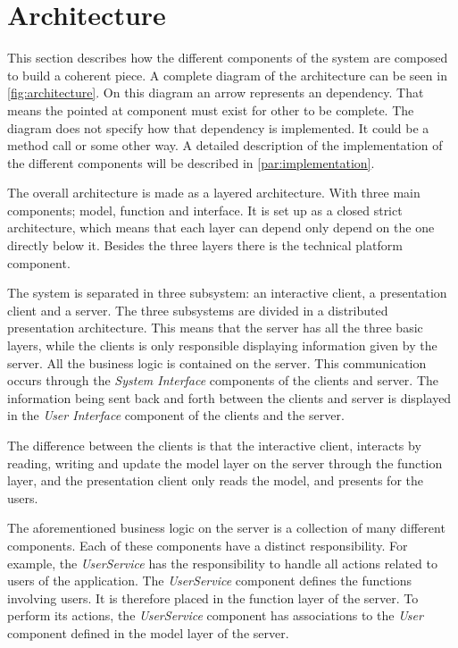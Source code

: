 \section{Architecture}
\label{sec:architecture}

This section describes how the different components of the system are
composed to build a coherent piece. A complete diagram of the architecture can be seen in \cref{fig:architecture}. On this diagram an arrow represents an dependency. That means the pointed at component must exist for other to be complete. The diagram does not specify how that dependency is implemented. It could be a method call or some other way. A detailed description of the implementation of the different components will be described in \cref{par:implementation}.

The overall architecture is made as a layered architecture. With three main components; model, function and interface. It is set up as a closed strict architecture, which means that each layer can depend only depend on the one directly below it. Besides the three layers there is the technical platform component.

The system is separated in three subsystem: an interactive client, a presentation client and a server. The three subsystems are divided in a distributed presentation architecture. This means that the server has all the three basic layers, while the clients is only responsible displaying information given by the server. All the business logic is contained on the
server. This communication occurs through the \textit{System Interface}
components of the clients and server. The information being sent back and
forth between the clients and server is displayed in the \textit{User Interface}
component of the clients and the server.

The difference between the clients is that the interactive client, interacts by reading, writing and update the model layer on the server through the function layer, and the presentation client only reads the model, and presents for the users.

The aforementioned business logic on the server is a collection of
many different components. Each of these components have a distinct
responsibility. For example, the \textit{UserService} has the responsibility to
handle all actions related to users of the application. The
\textit{UserService} component defines the functions involving users. It is
therefore placed in the function layer of the server. To perform its
actions, the \textit{UserService} component has associations to the \textit{User}
component defined in the model layer of the server.

